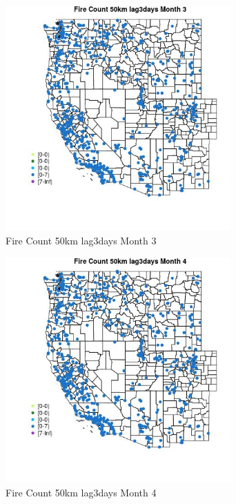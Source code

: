 \begin{figure} 
\centering  
\includegraphics[width=0.77\textwidth]{Code_Outputs/Report_ML_input_PM25_Step4_part_e_de_duplicated_aves_compiled_2019-05-21wNAs_MapObsMo3Fire_Count_50km_lag3days.jpg} 
\caption{\label{fig:Report_ML_input_PM25_Step4_part_e_de_duplicated_aves_compiled_2019-05-21wNAsMapObsMo3Fire_Count_50km_lag3days}Fire Count 50km lag3days Month 3} 
\end{figure} 
 

\begin{figure} 
\centering  
\includegraphics[width=0.77\textwidth]{Code_Outputs/Report_ML_input_PM25_Step4_part_e_de_duplicated_aves_compiled_2019-05-21wNAs_MapObsMo4Fire_Count_50km_lag3days.jpg} 
\caption{\label{fig:Report_ML_input_PM25_Step4_part_e_de_duplicated_aves_compiled_2019-05-21wNAsMapObsMo4Fire_Count_50km_lag3days}Fire Count 50km lag3days Month 4} 
\end{figure} 
 


